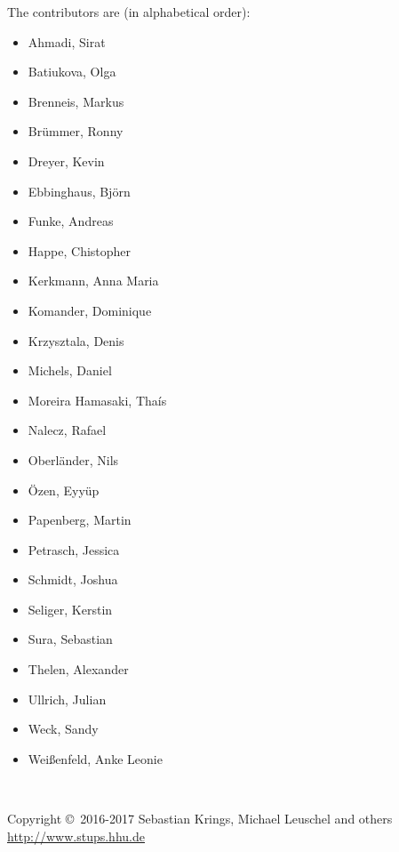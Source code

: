 \documentclass[11pt,oneside]{book} %
\begin{document}
\noindent
The contributors are (in alphabetical order):
\begin{itemize}
    \item Ahmadi, Sirat
    \item Batiukova, Olga
    \item Brenneis, Markus
    \item Brümmer, Ronny
    \item Dreyer, Kevin
    \item Ebbinghaus, Björn
    \item Funke, Andreas
    \item Happe, Chistopher
    \item Kerkmann, Anna Maria
    \item Komander, Dominique
    \item Krzysztala, Denis
    \item Michels, Daniel
    \item Moreira Hamasaki, Thaís
    \item Nalecz, Rafael
    \item Oberländer, Nils
    \item Özen, Eyyüp
    \item Papenberg, Martin
    \item Petrasch, Jessica
    \item Schmidt, Joshua
    \item Seliger, Kerstin
    \item Sura, Sebastian
    \item Thelen, Alexander
    \item Ullrich, Julian
    \item Weck, Sandy
    \item Weißenfeld, Anke Leonie
\end{itemize}

~\vfill

\noindent Copyright \copyright\ 2016-2017 Sebastian Krings, Michael Leuschel and others\\ %


\noindent \url{http://www.stups.hhu.de}\\ %
\end{document}

